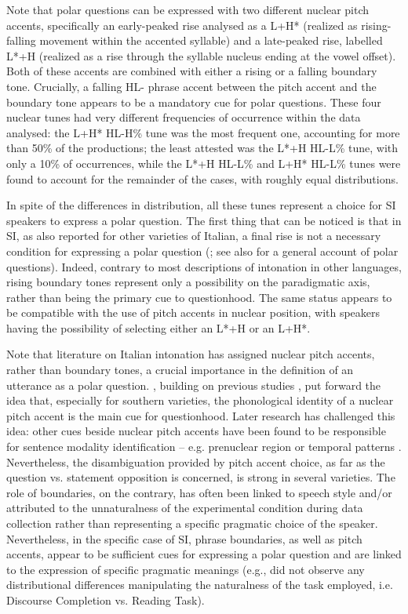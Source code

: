 \documentclass[output=paper,colorlinks,citecolor=brown]{langscibook}
\begin{document}
Note that polar questions can be expressed with two different nuclear pitch accents, specifically an early-peaked rise analysed as a L+H* (realized as rising-falling movement within the accented syllable) and a late-peaked rise, labelled L*+H (realized as a rise through the syllable nucleus ending at the vowel offset). Both of these accents are combined with either a rising or a falling boundary tone. Crucially, a falling HL- phrase accent between the pitch accent and the boundary tone appears to be a mandatory cue for polar questions. These four nuclear tunes had very different frequencies of occurrence within the data analysed: the L+H* HL-H\% tune was the most frequent one, accounting for more than 50\% of the productions; the least attested was the L*+H HL-L\% tune, with only a 10\% of occurrences, while the L*+H HL-L\% and L+H* HL-L\% tunes were found to account for the remainder of the cases, with roughly equal distributions.

In spite of the differences in distribution, all these tunes represent a choice for SI speakers to express a polar question. The first thing that can be noticed is that in SI, as also reported for other varieties of Italian, a final rise is not a necessary condition for expressing a polar question (\citealt{Fivelaetal15}; see also \citealt{savino2012} for a general account of polar questions). Indeed, contrary to most descriptions of intonation in other languages, rising boundary tones represent only a possibility on the paradigmatic axis, rather than being the primary cue to questionhood. The same status appears to be compatible with the use of pitch accents in nuclear position, with speakers having the possibility of selecting either an L*+H or an L+H*.

Note that literature on Italian intonation has assigned nuclear pitch accents, rather than boundary tones, a crucial importance in the definition of an utterance as a polar question. \citet{griceetal2005}, building on previous studies \citep[e.g. ][]{grice1995, savino1997, dimperio2002}, put forward the idea that, especially for southern varieties, the phonological identity of a nuclear pitch accent is the main cue for questionhood. Later research has challenged this idea: other cues beside nuclear pitch accents have been found to be responsible for sentence modality identification – e.g. prenuclear region \citep{petrone2011} or temporal patterns \citep{cangemind2015}. Nevertheless, the disambiguation provided by pitch accent choice, as far as the question vs. statement opposition is concerned, is strong in several varieties. The role of boundaries, on the contrary, has often been linked to speech style and/or attributed to the unnaturalness of the experimental condition during data collection \citep{savino2012, cangemigrice2016} rather than representing a specific pragmatic choice of the speaker. Nevertheless, in the specific case of SI, phrase boundaries, as well as pitch accents, appear to be sufficient cues for expressing a polar question and are linked to the expression of specific pragmatic meanings (e.g., \citealt{orrico19} did not observe any distributional differences manipulating the naturalness of the task employed, i.e. Discourse Completion vs. Reading Task).
\end{document}
